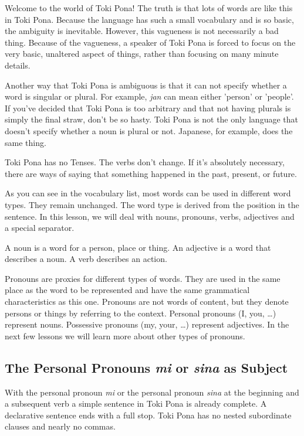 Welcome to the world of Toki Pona! The truth is that lots of words are like this in Toki Pona.
Because the language has such a small vocabulary and is so basic, the ambiguity is inevitable.
However, this vagueness is not necessarily a bad thing. Because of the vagueness, a speaker of Toki Pona is forced to focus on the very basic, unaltered aspect of things, rather than focusing on many minute details.

Another way that Toki Pona is ambiguous is that it can not specify whether a word is singular or plural.
For example, \textit{jan} can mean either 'person' or 'people'.
If you've decided that Toki Pona is too arbitrary and that not having plurals is simply the final straw, don't be so hasty.
Toki Pona is not the only language that doesn't specify whether a noun is plural or not.
Japanese, for example, does the same thing.

Toki Pona has no Tenses.
The verbs don't change.
If it's absolutely necessary, there are ways of saying that something happened in the past, present, or future.

As you can see in the vocabulary list, most words can be used in different word types.
They remain unchanged.
The word type is derived from the position in the sentence.
In this lesson, we will deal with nouns, pronouns, verbs, adjectives and a special separator.

A noun is a word for a person, place or thing.
An adjective is a word that describes a noun.
A verb describes an action.

Pronouns are proxies for different types of words.
They are used in the same place as the word to be represented and have the same grammatical characteristics as this one.
Pronouns are not words of content, but they denote persons or things by referring to the context.
Personal pronouns (I, you, \dots) represent nouns.
Possessive pronouns (my, your, \dots) represent adjectives.
In the next few lessons we will learn more about other types of pronouns.

%
\subsection*{The Personal Pronouns \textit{mi} or \textit{sina} as Subject}
%
%
With the personal pronoun \textit{mi} or the personal pronoun \textit{sina} at the beginning and a subsequent verb a simple sentence in Toki Pona is already complete.
A declarative sentence ends with a full stop.
Toki Pona has no nested subordinate clauses and nearly no commas.

